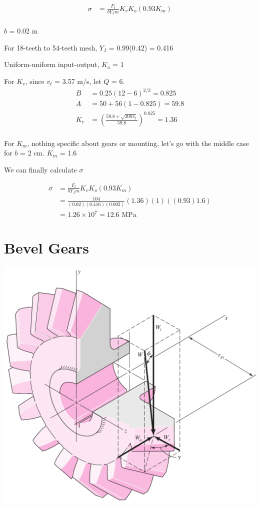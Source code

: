 \documentclass[a4paper,openany]{tufte-book}
\begin{document}
\begin{align*}
  \sigma &= \frac{F_{t}}{bY_{J}m}K_{v}K_{o}(0.93K_{m}) \\
\end{align*}

\(b\) = 0.02 m

For 18-teeth to 54-teeth mesh, \(Y_{J}\) = 0.99(0.42) = 0.416

Uniform-uniform input-output, \(K_{o}\) = 1

For \(K_{v}\), since \(v_{t}\) = 3.57 m/s, let \(Q\) = 6.
\begin{align*}
   B &= 0.25(12 - 6)^{2/3} = 0.825 \\
   A &= 50 + 56(1 - 0.825) = 59.8 \\
   K_{v} &= \left( \frac{59.8 + \sqrt{200v_{t}}}{59.8} \right)^{0.825} = 1.36 \\
\end{align*}

For \(K_{m}\), nothing specific about gears or mounting, let's go with the middle case for \(b\) = 2 cm. \(K_{m}\) = 1.6

We can finally calculate \(\sigma\)

\begin{align*}
  \sigma &= \frac{F_{t}}{bY_{J}m}K_{v}K_{o}(0.93K_{m}) \\
         &= \frac{104}{(0.02)(0.416)(0.002)}(1.36)(1)((0.93)1.6) \\
         &= 1.26 \times 10^{7} = 12.6 \text{ MPa}
\end{align*}

\chapter{Bevel Gears}
\label{sec:orgc90325d}

\begin{center}
\includegraphics[width=.9\linewidth]{./pictures/Gears/bevel-gear-forces.png}
\end{center}
\end{document}
